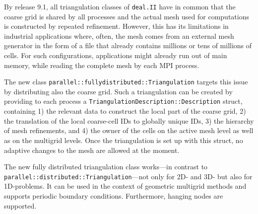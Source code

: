 \documentclass{ansarticle-preprint}
\begin{document}
By release 9.1, all triangulation classes of \texttt{deal.II} have in common that the coarse grid is shared by 
all processes and the actual mesh used for computations is constructed by repeated 
refinement. However, this has its limitations in industrial applications where, often, the mesh comes 
from an external mesh generator in the form of a file that already contains millions 
or tens of millions of cells. For such configurations, applications might already 
run out of  main memory, while reading the complete mesh by each MPI process. 

The new class \texttt{parallel::fullydistributed::Triangulation} targets this issue 
by distributing also the coarse grid. Such 
a triangulation can be created by providing to each process a \texttt{Triangulation\-De\-scrip\-tion::Description} struct, containing 
1) the relevant data to construct the local part of the coarse grid, 2) the 
translation of the local coarse-cell IDs to globally unique IDs, 3) the hierarchy 
of mesh refinements, and 4) the owner of the cells on the active mesh level as well 
as on the multigrid levels. Once the triangulation is set up with this struct, no adaptive
changes to the mesh are allowed at the moment.
 


The new fully distributed triangulation class works---in contrast to  
\texttt{parallel::distributed::\allowbreak Tri\-an\-gu\-la\-tion}---not only for 2D- and 3D- but also for 
1D-problems. It can be used in the context of geometric multigrid methods and 
supports periodic boundary conditions. Furthermore, hanging nodes are supported.
\end{document}
